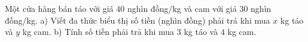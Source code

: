 \begin{bt}%
	Một cửa hàng bán táo với giá $40$ nghìn đồng/kg và cam với giá $30$ nghìn đồng/kg.
a) Viết đa thức biểu thị số tiền (nghìn đồng) phải trả khi mua $x$ kg táo và $y$ kg cam.
b) Tính số tiền phải trả khi mua $3$ kg táo và $4$ kg cam.
\end{bt}
